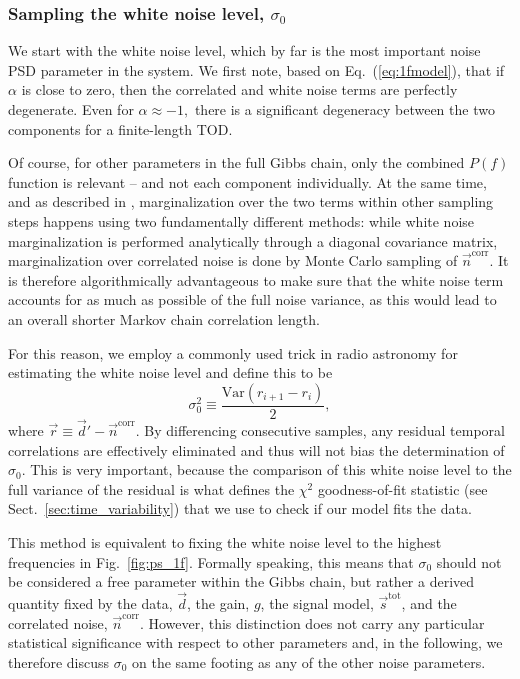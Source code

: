 \documentclass{aa}
\newcommand{\n}[0]{\vec{n}}
\begin{document}
\subsubsection{Sampling the white noise level, $\sigma_0$}

We start with the white noise level, which by far is the most
important noise PSD parameter in the system. We first note, based on
Eq.~(\ref{eq:1fmodel}), that if $\alpha$ is close to zero, then the
correlated and white noise terms are perfectly degenerate. Even for
$\alpha\approx-1,$ there is a significant degeneracy between the two
components for a finite-length TOD.

Of course, for other parameters in the full Gibbs chain, only the
combined $P(f)$ function is relevant -- and not each component
individually. At the same time, and as described in \citet{bp01},
marginalization over the two terms within other sampling steps happens
using two fundamentally different methods: while white noise
marginalization is performed analytically through a diagonal
covariance matrix, marginalization over correlated noise is done by
Monte Carlo sampling of $\n^{\mathrm{corr}}$. It is therefore
algorithmically advantageous to make sure that the white noise term
accounts for as much as possible of the full noise variance, as this
would lead to an overall shorter Markov chain correlation length.

For this reason, we employ a commonly used trick in radio astronomy
for estimating the white noise level and define this to be
\begin{equation}
  \sigma_0^2 \equiv \frac{\mathrm{Var}(r_{i+1} - r_i)}{2},
  \label{eq:sigma0}
\end{equation}
where $\vec{r} \equiv \vec{d}' - \vec{n}^\mathrm{corr}$. By differencing consecutive samples, any residual temporal correlations
are effectively eliminated and thus will not bias the
determination of $\sigma_0$. This is very important, because the comparison of this white noise level to the full variance of the residual is what defines the $\chi^2$ goodness-of-fit statistic (see Sect.~\ref{sec:time_variability}) that we use to check if our model fits the data.

This method is equivalent to fixing the white noise level to the
highest frequencies in Fig.~\ref{fig:ps_1f}. Formally speaking, this
means that $\sigma_0$ should not be considered a free parameter within
the Gibbs chain, but rather a derived quantity fixed by the data,
$\vec{d}$, the gain, $g$, the signal model, $\vec{s}^\mathrm{tot}$,
and the correlated noise, $\vec{n}^\mathrm{corr}$. However, this
distinction does not carry any particular statistical significance
with respect to other parameters and, in the following, we
therefore discuss $\sigma_0$ on the same footing as any of the other
noise parameters.
\end{document}
